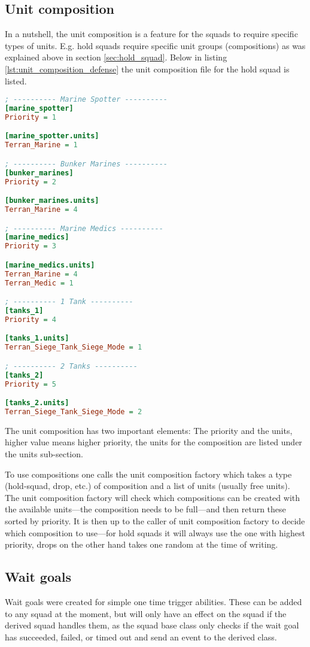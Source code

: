 \subsection{Unit composition}
\label{sec:unit_composition}
In a nutshell, the unit composition is a feature for the squads to require specific types of units. E.g. hold squads require specific unit groups (compositions) as was explained above in section \ref{sec:hold_squad}. Below in listing \ref{lst:unit_composition_defense} the unit composition file for the hold squad is listed.

\begin{lstlisting}[caption={Hold squad unit compositions},label={lst:unit_composition_defense},language=ini]
; ---------- Marine Spotter ----------
[marine_spotter]
Priority = 1

[marine_spotter.units]
Terran_Marine = 1

; ---------- Bunker Marines ----------
[bunker_marines]
Priority = 2

[bunker_marines.units]
Terran_Marine = 4

; ---------- Marine Medics ----------
[marine_medics]
Priority = 3

[marine_medics.units]
Terran_Marine = 4
Terran_Medic = 1

; ---------- 1 Tank ----------
[tanks_1]
Priority = 4

[tanks_1.units]
Terran_Siege_Tank_Siege_Mode = 1

; ---------- 2 Tanks ----------
[tanks_2]
Priority = 5

[tanks_2.units]
Terran_Siege_Tank_Siege_Mode = 2
\end{lstlisting}
The unit composition has two important elements: The priority and the units, higher value means higher priority, the units for the composition are listed under the units sub-section.

To use compositions one calls the unit composition factory which takes a type (hold-squad, drop, etc.) of composition and a list of units (usually free units). The unit composition factory will check which compositions can be created with the available units—the composition needs to be full—and then return these sorted by priority. It is then up to the caller of unit composition factory to decide which composition to use—for hold squads it will always use the one with highest priority, drops on the other hand takes one random at the time of writing.

\subsection{Wait goals}
\label{sec:wait_goals}
Wait goals were created for simple one time trigger abilities. These can be added to any squad at the moment, but will only have an effect on the squad if the derived squad handles them, as the squad base class only checks if the wait goal has succeeded, failed, or timed out and send an event to the derived class.

